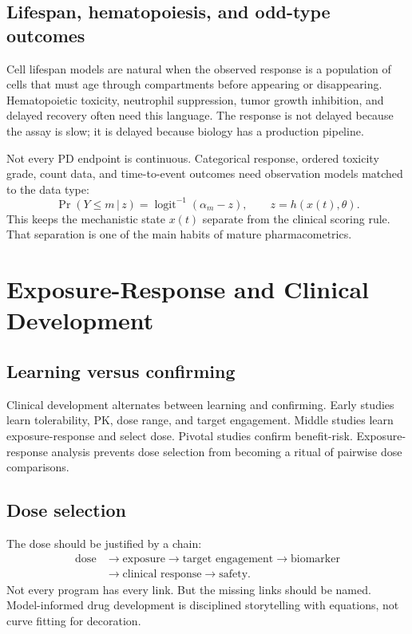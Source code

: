 \documentclass[a4paper]{article}
\newcommand{\given}{\,|\,}
\begin{document}
\subsection{Lifespan, hematopoiesis, and odd-type outcomes}

Cell lifespan models are natural when the observed response is a population of cells that must age through compartments before appearing or disappearing. Hematopoietic toxicity, neutrophil suppression, tumor growth inhibition, and delayed recovery often need this language. The response is not delayed because the assay is slow; it is delayed because biology has a production pipeline.

Not every PD endpoint is continuous. Categorical response, ordered toxicity grade, count data, and time-to-event outcomes need observation models matched to the data type:
\[
  \Pr(Y\le m\given z)
  =
  \operatorname{logit}^{-1}(\alpha_m-z),
  \qquad
  z=h(x(t),\theta).
\]
This keeps the mechanistic state \(x(t)\) separate from the clinical scoring rule. That separation is one of the main habits of mature pharmacometrics.

\section{Exposure-Response and Clinical Development}

\subsection{Learning versus confirming}

Clinical development alternates between learning and confirming. Early studies learn tolerability, PK, dose range, and target engagement. Middle studies learn exposure-response and select dose. Pivotal studies confirm benefit-risk. Exposure-response analysis prevents dose selection from becoming a ritual of pairwise dose comparisons.

\subsection{Dose selection}

The dose should be justified by a chain:
\[
  \begin{aligned}
  \text{dose}
  &\to
  \text{exposure}
  \to
  \text{target engagement}
  \to
  \text{biomarker}\\
  &\to
  \text{clinical response}
  \to
  \text{safety}.
  \end{aligned}
\]
Not every program has every link. But the missing links should be named. Model-informed drug development is disciplined storytelling with equations, not curve fitting for decoration.
\end{document}
